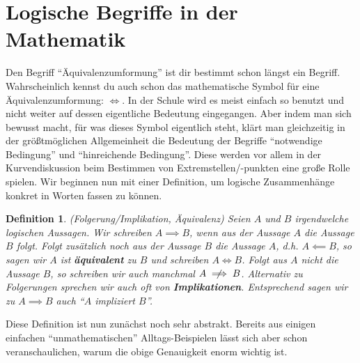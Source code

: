 \documentclass[11pt,reqno, a4paper]{book}
\renewcommand{\textbf}[1]{{\normalfont\bf #1}}
\theoremstyle{mystyle}
\newtheorem{definition}[theorem]{Definition}
\theoremstyle{definition}
\numberwithin{equation}{chapter}
\begin{document}
\section{Logische Begriffe in der Mathematik}
Den Begriff "`Äquivalenzumformung"' ist dir bestimmt schon längst ein Begriff. Wahrscheinlich kennst du auch schon das mathematische Symbol für eine Äquivalenzumformung: \(\iff\). In der Schule wird es meist einfach so benutzt und nicht weiter auf dessen eigentliche Bedeutung eingegangen. Aber indem man sich bewusst macht, für was dieses Symbol eigentlich steht, klärt man gleichzeitig in der größtmöglichen Allgemeinheit die Bedeutung der Begriffe "`notwendige Bedingung"' und "`hinreichende Bedingung"'. Diese werden vor allem in der Kurvendiskussion beim Bestimmen von Extremstellen/-punkten eine große Rolle spielen. Wir beginnen nun mit einer Definition, um logische Zusammenhänge konkret in Worten fassen zu können. 
\begin{definition}(Folgerung/Implikation, Äquivalenz)
    Seien \(A\) und \(B\) irgendwelche logischen Aussagen. Wir schreiben \(A\implies B\), wenn aus der Aussage \(A\) die Aussage \(B\) folgt. Folgt zusätzlich noch aus der Aussage \(B\) die Aussage \(A\), d.h. \(A \impliedby B\), so sagen wir \(A\) ist \textbf{äquivalent} zu \(B\) und schreiben \(A \iff B\). Folgt aus \(A\) nicht die Aussage \(B\), so schreiben wir auch manchmal \(A \centernot\implies B\). Alternativ zu Folgerungen sprechen wir auch oft von \textbf{Implikationen}. Entsprechend sagen wir zu \(A \implies B\) auch "`\(A\) impliziert \(B\)"'. 
\end{definition}
Diese Definition ist nun zunächst noch sehr abstrakt. Bereits aus einigen einfachen "`unmathematischen"' Alltags-Beispielen lässt sich aber schon veranschaulichen, warum die obige Genauigkeit enorm wichtig ist. 
\end{document}
